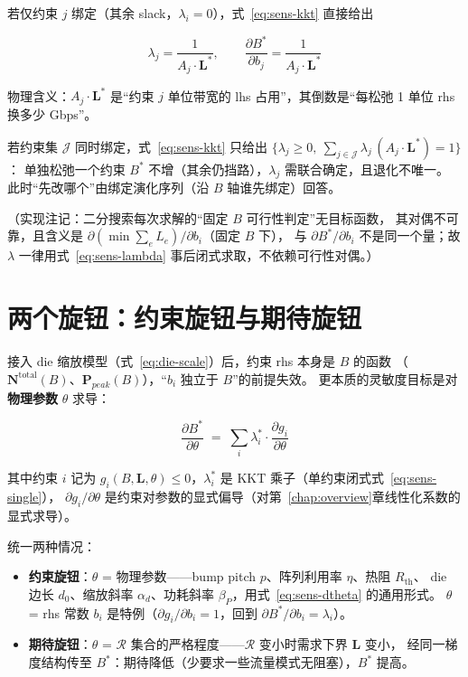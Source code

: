 若仅约束 $j$ 绑定（其余 slack，$\lambda_i=0$），式~\eqref{eq:sens-kkt} 直接给出

\begin{equation}\label{eq:sens-single}
    \lambda_j = \frac{1}{A_j \cdot \mathbf{L}^*},
    \qquad
    \frac{\partial B^*}{\partial b_j} = \frac{1}{A_j \cdot \mathbf{L}^*}
\end{equation}

物理含义：$A_j\cdot\mathbf{L}^*$ 是``约束 $j$ 单位带宽的 lhs 占用''，其倒数是``每松弛 1 单位 rhs 换多少 Gbps''。

若约束集 $\mathcal{J}$ 同时绑定，式~\eqref{eq:sens-kkt} 只给出
$\{\lambda_j\ge 0,\ \sum_{j\in\mathcal{J}}\lambda_j\,(A_j\cdot\mathbf{L}^*)=1\}$：
单独松弛一个约束 $B^*$ 不增（其余仍挡路），$\lambda_j$ 需联合确定，且退化不唯一。
此时``先改哪个''由绑定演化序列（沿 $B$ 轴谁先绑定）回答。

（实现注记：二分搜索每次求解的``固定 $B$ 可行性判定''无目标函数，
其对偶不可靠，且含义是 $\partial(\min\sum_e L_e)/\partial b_i$（固定 $B$ 下），
与 $\partial B^*/\partial b_i$ 不是同一个量；故 $\lambda$ 一律用式~\eqref{eq:sens-lambda} 事后闭式求取，不依赖可行性对偶。）

\section{两个旋钮：约束旋钮与期待旋钮}\label{sec:sens-knobs}

接入 die 缩放模型（式~\eqref{eq:die-scale}）后，约束 rhs 本身是 $B$ 的函数
（$\mathbf{N}^{\text{total}}(B)$、$\mathbf{P}_{peak}(B)$），``$b_i$ 独立于 $B$''的前提失效。
更本质的灵敏度目标是对\textbf{物理参数} $\theta$ 求导：

\begin{equation}\label{eq:sens-dtheta}
    \frac{\partial B^*}{\partial \theta}
    \;=\; \sum_i \lambda_i^* \cdot \frac{\partial g_i}{\partial \theta}
\end{equation}

其中约束 $i$ 记为 $g_i(B,\mathbf{L},\theta)\le 0$，$\lambda_i^*$ 是 KKT 乘子（单约束闭式式~\eqref{eq:sens-single}），
$\partial g_i/\partial\theta$ 是约束对参数的显式偏导（对第~\ref{chap:overview}章线性化系数的显式求导）。

统一两种情况：

\begin{itemize}
\item \textbf{约束旋钮}：$\theta$ = 物理参数——bump pitch $p$、阵列利用率 $\eta$、热阻 $R_{\text{th}}$、
die 边长 $d_0$、缩放斜率 $\alpha_d$、功耗斜率 $\beta_P$，用式~\eqref{eq:sens-dtheta} 的通用形式。
$\theta$ = rhs 常数 $b_i$ 是特例（$\partial g_i/\partial b_i=1$，回到 $\partial B^*/\partial b_i=\lambda_i$）。
\item \textbf{期待旋钮}：$\theta$ = $\mathcal{R}$ 集合的严格程度——$\mathcal{R}$ 变小时需求下界 $\mathbf{L}$ 变小，
经同一梯度结构传至 $B^*$：期待降低（少要求一些流量模式无阻塞），$B^*$ 提高。
\end{itemize}


